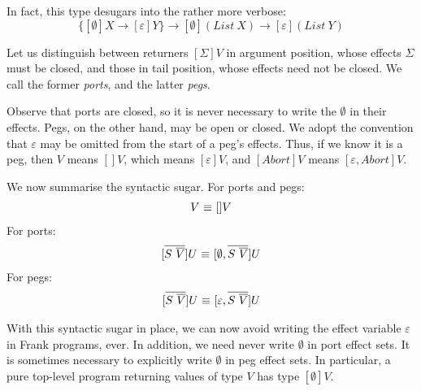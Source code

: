 \documentclass[preprint]{sigplanconf}
\makeatletter
\newcommand{\many}{\overline}
\newcommand\ba{\begin{array}}
\newcommand\ea{\end{array}}
\newenvironment{equations}{\[\ba{@{}r@{~}c@{~}l@{}}}{\ea\]}
\newcommand{\sigs}{\Sigma}
\newcommand{\effbox}[1]{[#1]}
\newcommand{\var}{\mathit}
\newcommand{\thunk}[1]{\{{#1}\}}
\newcommand{\force}[1]{{#1}!}
\makeatother
\begin{document}
In fact, this type desugars into the rather more verbose:
\[
\thunk{\effbox{\emptyset}X \to \effbox{\varepsilon}Y}
  \to \effbox{\emptyset}(\var{List~X}) \to \effbox{\varepsilon}(\var{List~Y})
\]

Let us distinguish between returners $\effbox{\sigs}V$ in argument
position, whose effects $\sigs$ must be closed, and those in tail
position, whose effects need not be closed. We call the former
\emph{ports}, and the latter \emph{pegs}.

Observe that ports are closed, so it is never necessary to write the
$\emptyset$ in their effects. Pegs, on the other hand, may be open or
closed. We adopt the convention that $\varepsilon$ may be omitted from
the start of a peg's effects. Thus, if we know it is a peg, then $V$
means $\effbox{}V$, which means $\effbox{\varepsilon}V$, and
$\effbox{\var{Abort}}V$ means $\effbox{\varepsilon, \var{Abort}}V$.

We now summarise the syntactic sugar. For ports and pegs:
\begin{equations}
V &\equiv& \effbox{}V \\
\end{equations}
For ports:
\begin{equations}
\effbox{\many{S~\many{V}}}U &\equiv& \effbox{\emptyset, \many{S~\many{V}}}U \\
\end{equations}
For pegs:
\begin{equations}
\effbox{\many{S~\many{V}}}U &\equiv& \effbox{\varepsilon, \many{S~\many{V}}}U \\
\end{equations}

With this syntactic sugar in place, we can now avoid writing the
effect variable $\varepsilon$ in Frank programs, ever. In addition, we
need never write $\emptyset$ in port effect sets. It is sometimes
necessary to explicitly write $\emptyset$ in peg effect sets. In
particular, a pure top-level program returning values of type $V$ has
type $\effbox{\emptyset}V$.






\end{document}
